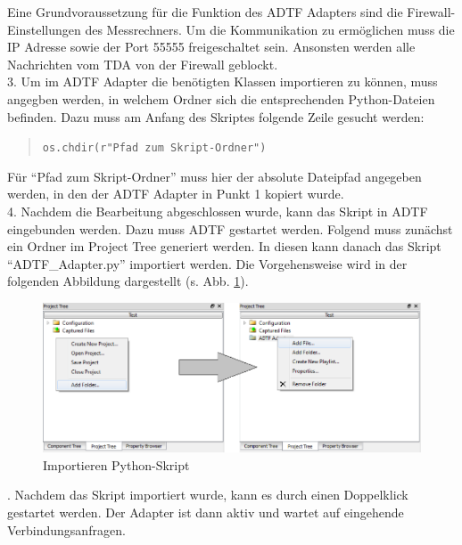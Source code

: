\documentclass[12pt,a4paper]{report}
\begin{document}
Eine Grundvoraussetzung für die Funktion des ADTF Adapters sind die Firewall-Einstellungen des Messrechners. Um die Kommunikation zu ermöglichen muss die IP Adresse sowie der Port 55555 freigeschaltet sein. Ansonsten werden alle Nachrichten vom TDA von der Firewall geblockt.
\\[0.5cm]
3. Um im ADTF Adapter die benötigten Klassen importieren zu können, muss angegben werden, in welchem Ordner sich die entsprechenden Python-Dateien befinden. Dazu muss am Anfang des Skriptes folgende Zeile gesucht werden:
\begin{quote}
\verb|os.chdir(r"Pfad zum Skript-Ordner")|\\
\end{quote}
\noindent Für "`Pfad zum Skript-Ordner"' muss hier der absolute Dateipfad angegeben werden, in den der ADTF Adapter in Punkt 1 kopiert wurde.
\\[0.5cm]
4. Nachdem die Bearbeitung abgeschlossen wurde, kann das Skript in ADTF eingebunden werden. Dazu muss ADTF gestartet werden. Folgend muss zunächst ein Ordner im Project Tree generiert werden. In diesen kann danach das Skript "`ADTF\_Adapter.py"' importiert werden. Die Vorgehensweise wird in der folgenden Abbildung dargestellt (s. Abb. \ref{pic:Importieren Python-Skript}).
\begin{figure}[H]
\begin{center}
\includegraphics[width=1\linewidth]{Darstellungen/EinbindungSkript.pdf}
\caption{Importieren Python-Skript}\label{pic:Importieren Python-Skript}
\end{center}
\end{figure} 
. Nachdem das Skript importiert wurde, kann es durch einen Doppelklick gestartet werden. Der Adapter ist dann aktiv und wartet auf eingehende Verbindungsanfragen.
\end{document}
